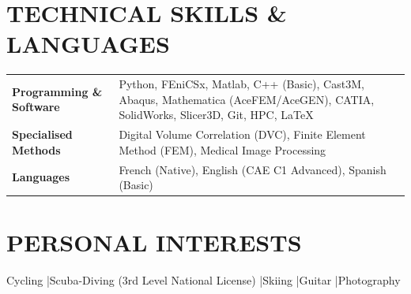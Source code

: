 \documentclass[10pt, a4paper]{article}
\begin{document}
\section{TECHNICAL SKILLS \& LANGUAGES}

\noindent
\begin{tabularx}{\linewidth}{lX}
  \textbf{Programming \& Software} & Python, FEniCSx, Matlab, C++ (Basic), Cast3M, Abaqus, Mathematica (AceFEM/AceGEN), CATIA, SolidWorks, Slicer3D, Git, HPC, \LaTeX \\[3pt]
  \textbf{Specialised Methods} & Digital Volume Correlation (DVC), Finite Element Method (FEM), Medical Image Processing \\[3pt]
  \textbf{Languages} & French (Native), English (CAE C1 Advanced), Spanish (Basic) \\
\end{tabularx}

\section{PERSONAL INTERESTS}

\noindent Cycling \quad|\quad Scuba-Diving (3rd Level National License) \quad|\quad Skiing \quad|\quad Guitar \quad|\quad Photography
\end{document}
